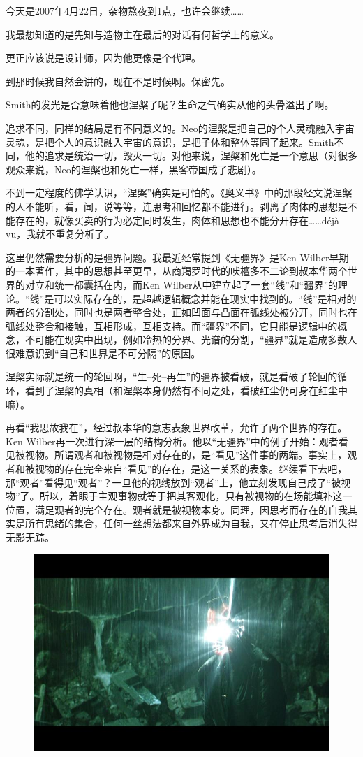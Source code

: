 \documentclass[UTF8]{ctexart}
\begin{document}
今天是2007年4月22日，杂物熬夜到1点，也许会继续……

我最想知道的是先知与造物主在最后的对话有何哲学上的意义。

更正应该说是设计师，因为他更像是个代理。

到那时候我自然会讲的，现在不是时候啊。保密先。

Smith的发光是否意味着他也涅槃了呢？生命之气确实从他的头骨溢出了啊。

追求不同，同样的结局是有不同意义的。Neo的涅槃是把自己的个人灵魂融入宇宙灵魂，是把个人的意识融入宇宙的意识，是把子体和整体等同了起来。Smith不同，他的追求是统治一切，毁灭一切。对他来说，涅槃和死亡是一个意思（对很多观众来说，Neo的涅槃也和死亡一样，黑客帝国成了悲剧）。

不到一定程度的佛学认识，“涅槃”确实是可怕的。《奥义书》中的那段经文说涅槃的人不能听，看，闻，说等等，连思考和回忆都不能进行。剥离了肉体的思想是不能存在的，就像买卖的行为必定同时发生，肉体和思想也不能分开存在……déjà vu，我就不重复分析了。

这里仍然需要分析的是疆界问题。我最近经常提到《无疆界》是Ken Wilber早期的一本著作，其中的思想甚至更早，从商羯罗时代的吠檀多不二论到叔本华两个世界的对立和统一都囊括在内，而Ken Wilber从中建立起了一套“线”和“疆界”的理论。“线”是可以实际存在的，是超越逻辑概念并能在现实中找到的。“线”是相对的两者的分割处，同时也是两者整合处，正如凹面与凸面在弧线处被分开，同时也在弧线处整合和接触，互相形成，互相支持。而“疆界”不同，它只能是逻辑中的概念，不可能在现实中出现，例如冷热的分界、光谱的分割，“疆界”就是造成多数人很难意识到“自己和世界是不可分隔”的原因。

涅槃实际就是统一的轮回啊，“生--死--再生”的疆界被看破，就是看破了轮回的循环，看到了涅槃的真相（和涅槃本身仍然有不同之处，看破红尘仍可身在红尘中嘛）。

再看“我思故我在”，经过叔本华的意志表象世界改革，允许了两个世界的存在。Ken Wilber再一次进行深一层的结构分析。他以“无疆界”中的例子开始：观者看见被视物。所谓观者和被视物是相对存在的，是“看见”这件事的两端。事实上，观者和被视物的存在完全来自“看见”的存在，是这一关系的表象。继续看下去吧，那“观者”看得见“观者”？一旦他的视线放到“观者”上，他立刻发现自己成了“被视物”了。所以，着眼于主观事物就等于把其客观化，只有被视物的在场能填补这一位置，满足观者的完全存在。观者就是被视物本身。同理，因思考而存在的自我其实是所有思绪的集合，任何一丝想法都来自外界成为自我，又在停止思考后消失得无影无踪。

\begin{figure}[htb]
\centering
\includegraphics[width=0.5\linewidth]{fig/59dd6d814bc34ddcbd3e1e54.jpg}
\end{figure}
\end{document}
